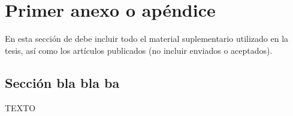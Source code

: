 
\chapter{Primer anexo o apéndice}
\label{app:nombreApendice}

{\color{blue} En esta sección de debe incluir todo el material suplementario utilizado en la tesis, así como los artículos publicados (no incluir enviados o aceptados). }


\section{Sección bla bla ba}

TEXTO

